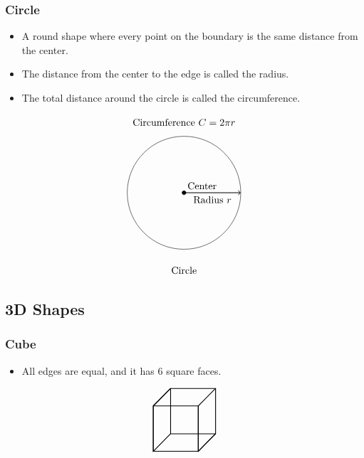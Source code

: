 \subsubsection{Circle}
\begin{itemize}
    \item A round shape where every point on the boundary is the same distance from the center.
    \item The distance from the center to the edge is called the radius.
    \item The total distance around the circle is called the circumference.
\end{itemize}
\[
\begin{tikzpicture}
    \draw (0,0) circle (2);
    
    \draw[->, thick] (0,0) -- (2,0);
    \node[below] at (1,0) {Radius \(r\)};
    
    \filldraw[black] (0,0) circle (2pt) node[above right] {Center};

    \node[above] at (0,2.25) {Circumference \(C = 2\pi r\)};
    
    \node[below] at (0,-2.5) {Circle};
\end{tikzpicture}
\]



\subsection{3D Shapes}

\subsubsection{Cube}
\begin{itemize}
    \item All edges are equal, and it has 6 square faces.
\end{itemize}
\[
\begin{tikzpicture}[scale=0.8]
    \draw[thick] (0,0,0) -- (2,0,0) -- (2,2,0) -- (0,2,0) -- cycle; %
    \draw[thick] (0,0,0) -- (0,0,2) -- (0,2,2) -- (0,2,0); %
    \draw[thick] (2,0,0) -- (2,0,2) -- (2,2,2) -- (2,2,0); %
    \draw[thick] (0,0,2) -- (2,0,2) -- (2,2,2) -- (0,2,2) -- cycle; %
    \draw[thick] (0,2,0) -- (0,2,2); %
    \draw[thick] (2,0,0) -- (2,0,2); %
\end{tikzpicture}
\]

